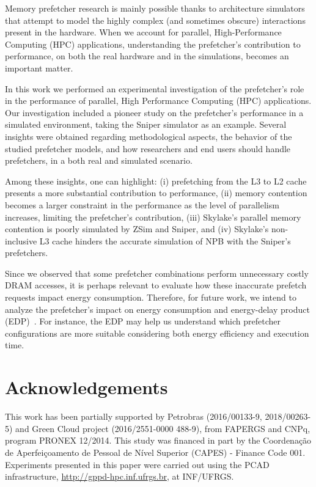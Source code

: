 \documentclass[AMA,final,STIX1COL]{WileyNJD-v2}
\begin{document}
Memory prefetcher research is mainly possible thanks to architecture simulators that attempt to model the highly complex (and sometimes obscure) interactions present in the hardware. When we account for parallel, High-Performance Computing (HPC) applications, understanding the prefetcher's contribution to performance, on both the real hardware and in the simulations, becomes an important matter. 

In this work we performed an experimental investigation of the prefetcher's role in the performance of parallel, High Performance Computing (HPC) applications. Our investigation included a pioneer study on the prefetcher's performance in a simulated environment, taking the Sniper simulator as an example. Several insights were obtained regarding methodological aspects, the behavior of the studied prefetcher models, and how researchers and end users should handle prefetchers, in a both real and simulated scenario. 


Among these insights, one can highlight: (i) prefetching from the L3 to L2 cache presents a more substantial contribution to performance, (ii) memory contention becomes a larger constraint in the performance as the level of parallelism increases, limiting the prefetcher's contribution, (iii) Skylake's parallel memory contention is poorly simulated by ZSim and Sniper, and (iv) Skylake's non-inclusive L3 cache hinders the accurate simulation of NPB with the Sniper's prefetchers.

Since we observed that some prefetcher combinations perform unnecessary costly DRAM accesses, it is perhaps relevant to evaluate how these inaccurate prefetch requests impact energy consumption. Therefore, for future work, we intend to analyze the prefetcher's impact on energy consumption and energy-delay product (EDP)~\cite{gonzalez1996edp}. For instance, the EDP may help us understand which prefetcher configurations are more suitable considering both energy efficiency and execution time.


\section*{Acknowledgements}
This work has been partially supported by Petrobras (2016/00133-9, 2018/00263-5) and Green Cloud project (2016/2551-0000 488-9), from FAPERGS and CNPq, program PRONEX 12/2014. This study was financed in part by the Coordenação de Aperfeiçoamento de Pessoal de Nível Superior (CAPES) - Finance Code 001. Experiments presented in this paper were carried out using the PCAD infrastructure, \url{http://gppd-hpc.inf.ufrgs.br}, at INF/UFRGS.


\end{document}
